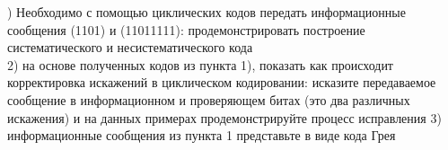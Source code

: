 ) Необходимо с помощью циклических кодов  передать  информационные сообщения (1101) и (11011111): продемонстрировать построение систематического и несистематического кода \\
2) на основе полученных кодов из пункта 1), показать как происходит корректировка искажений в циклическом кодировании: исказите передаваемое сообщение в информационном и проверяющем битах (это два различных искажения) и на данных примерах продемонстрируйте процесс исправления 
3) информационные сообщения из пункта 1 представьте в виде кода Грея